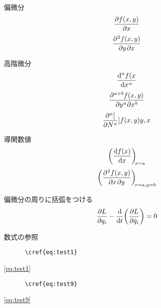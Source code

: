 \documentclass[uplatex, 11pt, a4j, dvipdfmx]{jsarticle}
\begin{document}
      偏微分
      \begin{equation}
        \diffp{f(x, y)}{x} \label{eq:test3}
      \end{equation}
      \begin{equation}
        \diffp{f(x, y)}{y, x} \label{eq:test4}
      \end{equation}

      高階微分
      \begin{equation}
        \diff[n]{f(x}{x} \label{eq:test5}
      \end{equation}
      \begin{equation}
        \diffp[a, b]{f(x, y)}{y, x} \label{eq:test5'}
      \end{equation}
      \begin{equation}
        \diffp[a, b][N]{f(x, y)}{y, x} \label{eq:test6}
      \end{equation}

      導関数値
      \begin{equation}
        \diff{f(x)}{x}[x=a] \label{eq:test7}
      \end{equation}
      \begin{equation}
        \diffp{f(x, y)}{x, y}[x=a, y=b] \label{eq:test8}
      \end{equation}

      偏微分の周りに括弧をつける
      \begin{equation}
        \diffp{L}{q_i}-\diff*{\diffp{L}{\dot{q}_i}[]}{t}=0 \label{eq:test9}
      \end{equation}



    数式の参照
    \begin{verbatim}
      \cref{eq:test1}
    \end{verbatim}
    \cref{eq:test1}

    \begin{verbatim}
      \cref{eq:test9}
    \end{verbatim}
    \cref{eq:test9}
\end{document}

